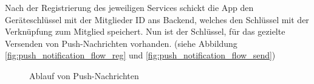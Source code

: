 Nach der Registrierung des jeweiligen Services schickt die App den Geräteschlüssel mit der Mitglieder ID ans Backend, welches den Schlüssel mit der Verknüpfung zum Mitglied speichert. Nun ist der Schlüssel, für das gezielte Versenden von Push-Nachrichten vorhanden. (siehe Abbildung \ref{fig:push_notification_flow_reg} und \ref{fig:push_notification_flow_send})
\begin{figure}[ht]
\centering
{}
\label{fig:app_settings}
\caption{Ablauf von Push-Nachrichten}
\end{figure}

